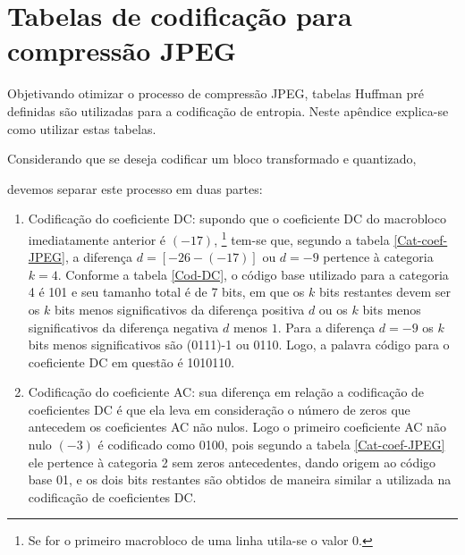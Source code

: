 
\thispagestyle{fancy}
\renewcommand{\thesubsection}{\Alph{section}}
\section{Tabelas de codificação para compressão JPEG}
\label{ap_JPEG}

Objetivando otimizar o processo de compressão JPEG, tabelas Huffman pré definidas são utilizadas para a codificação de entropia. Neste apêndice explica-se como utilizar estas tabelas.

Considerando que se deseja codificar um bloco transformado e quantizado,
\begin{minipage}{1.\textwidth}
\centering
[-26 -3 1 -3 -2 -6 2 -4 1 -4 1 1 5 0 2 0 0 -1 2 0 0 0 0 0 -1 -1 EOB]
\end{minipage}
devemos separar este processo em duas partes:
\begin{enumerate}
\item Codificação do coeficiente DC: supondo que o coeficiente DC do macrobloco imediatamente anterior é $ (-17) $, \footnote{Se for o primeiro macrobloco de uma linha utila-se o valor 0.} tem-se que, segundo a tabela \ref{Cat-coef-JPEG}, a diferença $ d = [-26-(-17)] $ ou $ d=-9 $ pertence à categoria $ k=4 $. Conforme a tabela \ref{Cod-DC}, o código base utilizado para a categoria 4 é 101 e seu tamanho total é de 7 bits, em que os $ k $ bits restantes devem ser os $ k $ bits menos significativos da diferença positiva $ d $ ou os $ k $ bits menos significativos da diferença negativa $ d $ menos $1$. Para a diferença $ d = -9$ os $k$ bits menos significativos são (0111)-1 ou 0110. Logo, a palavra código para o coeficiente DC em questão é 1010110.

\item Codificação do coeficiente AC: sua diferença em relação a codificação de coeficientes DC é que ela leva em consideração o número de zeros que antecedem os coeficientes AC não nulos. Logo o primeiro coeficiente AC não nulo $(-3)$ é codificado como 0100, pois segundo a tabela \ref{Cat-coef-JPEG} ele pertence à categoria 2 sem zeros antecedentes, dando origem ao código base 01, e os dois bits restantes são obtidos de maneira similar a utilizada na codificação de coeficientes DC. 
\end{enumerate}

